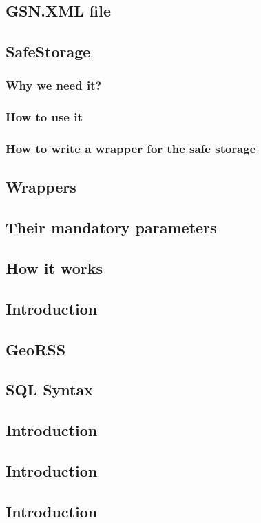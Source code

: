 \subsection{GSN.XML file}
\subsection{SafeStorage}
\subsubsection{Why we need it? }
\subsubsection{How to use it }
\subsubsection{How to write a wrapper for the safe storage}
\subsection{Wrappers}
\subsection{Their mandatory parameters}
\subsection{How it works}
\subsection{Introduction}
\subsection{GeoRSS}
\subsection{SQL Syntax}
\subsection{Introduction}
\subsection{Introduction}
\subsection{Introduction}

